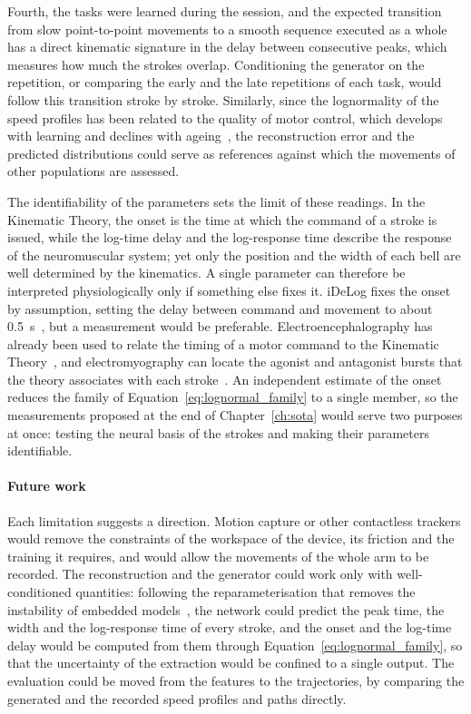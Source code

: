 \documentclass[12pt]{report}
\begin{document}
Fourth, the tasks were learned during the session, and the expected transition from slow point-to-point movements to a smooth sequence executed as a whole~\cite[pp.~34--38, 56--58]{senatore2012} has a direct kinematic signature in the delay between consecutive peaks, which measures how much the strokes overlap. Conditioning the generator on the repetition, or comparing the early and the late repetitions of each task, would follow this transition stroke by stroke. Similarly, since the lognormality of the speed profiles has been related to the quality of motor control, which develops with learning and declines with ageing~\cite{plamondon2013}, the reconstruction error and the predicted distributions could serve as references against which the movements of other populations are assessed.

The identifiability of the parameters sets the limit of these readings. In the Kinematic Theory, the onset is the time at which the command of a stroke is issued, while the log-time delay and the log-response time describe the response of the neuromuscular system; yet only the position and the width of each bell are well determined by the kinematics. A single parameter can therefore be interpreted physiologically only if something else fixes it. iDeLog fixes the onset by assumption, setting the delay between command and movement to about 0.5~s~\cite{idelog}, but a measurement would be preferable. Electroencephalography has already been used to relate the timing of a motor command to the Kinematic Theory~\cite{oreilly2013eeg}, and electromyography can locate the agonist and antagonist bursts that the theory associates with each stroke~\cite[p.~755]{enoka2021}. An independent estimate of the onset reduces the family of Equation~\eqref{eq:lognormal_family} to a single member, so the measurements proposed at the end of Chapter~\ref{ch:sota} would serve two purposes at once: testing the neural basis of the strokes and making their parameters identifiable.

\paragraph{Future work}
Each limitation suggests a direction. Motion capture or other contactless trackers would remove the constraints of the workspace of the device, its friction and the training it requires, and would allow the movements of the whole arm to be recorded. The reconstruction and the generator could work only with well-conditioned quantities: following the reparameterisation that removes the instability of embedded models~\cite{cheng1992embedded}, the network could predict the peak time, the width and the log-response time of every stroke, and the onset and the log-time delay would be computed from them through Equation~\eqref{eq:lognormal_family}, so that the uncertainty of the extraction would be confined to a single output. The evaluation could be moved from the features to the trajectories, by comparing the generated and the recorded speed profiles and paths directly.
\end{document}

